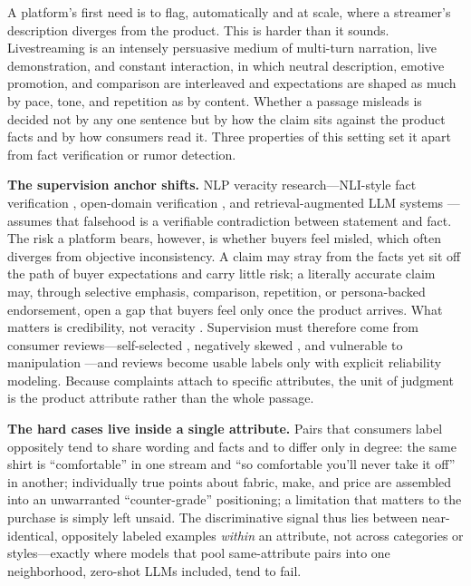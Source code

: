 \documentclass[letterpaper]{article}
\begin{document}
A platform's first need is to flag, automatically and at scale, where a streamer's description diverges from the product. This is harder than it sounds. Livestreaming is an intensely persuasive medium of multi-turn narration, live demonstration, and constant interaction, in which neutral description, emotive promotion, and comparison are interleaved and expectations are shaped as much by pace, tone, and repetition as by content. Whether a passage misleads is decided not by any one sentence but by how the claim sits against the product facts and by how consumers read it. Three properties of this setting set it apart from fact verification or rumor detection.

\textbf{The supervision anchor shifts.} NLP veracity research---NLI-style fact verification \citep{thorne2018fever}, open-domain verification \citep{guo2022survey}, and retrieval-augmented LLM systems \citep{putta2025claimcheck}---assumes that falsehood is a verifiable contradiction between statement and fact. The risk a platform bears, however, is whether buyers feel misled, which often diverges from objective inconsistency. A claim may stray from the facts yet sit off the path of buyer expectations and carry little risk; a literally accurate claim may, through selective emphasis, comparison, repetition, or persona-backed endorsement, open a gap that buyers feel only once the product arrives. What matters is credibility, not veracity \citep{mavlanova2012signaling}. Supervision must therefore come from consumer reviews---self-selected \citep{li2008selfselection}, negatively skewed \citep{baumeister2001bad}, and vulnerable to manipulation \citep{mayzlin2014promotional,luca2016fake,he2022fakemarket}---and reviews become usable labels only with explicit reliability modeling. Because complaints attach to specific attributes, the unit of judgment is the product attribute rather than the whole passage.

\textbf{The hard cases live inside a single attribute.} Pairs that consumers label oppositely tend to share wording and facts and to differ only in degree: the same shirt is ``comfortable'' in one stream and ``so comfortable you'll never take it off'' in another; individually true points about fabric, make, and price are assembled into an unwarranted ``counter-grade'' positioning; a limitation that matters to the purchase is simply left unsaid. The discriminative signal thus lies between near-identical, oppositely labeled examples \emph{within} an attribute, not across categories or styles---exactly where models that pool same-attribute pairs into one neighborhood, zero-shot LLMs included, tend to fail.
\end{document}
